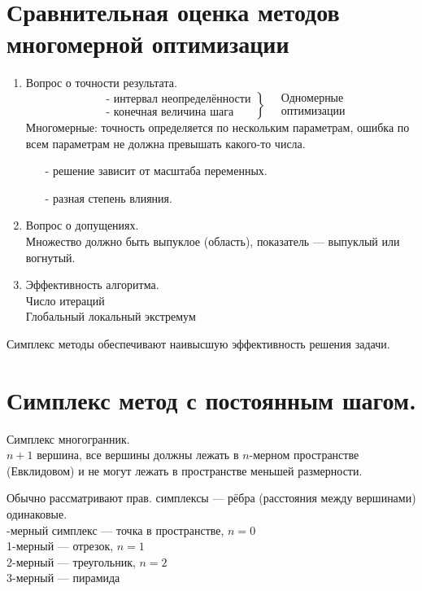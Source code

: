 \documentclass[12pt,a5paper]{scrbook}
\begin{document}
  \section{Сравнительная оценка методов многомерной оптимизации}
  \begin{enumerate}
    \item Вопрос о точности результата.
    \[
      \left.
        \begin{aligned}
          &\text{- интервал неопределённости}\\
          &\text{- конечная величина шага}
       \end{aligned}
     \right\}
     \, 
       \begin{aligned}
         &\text{Одномерные}\\ 
         &\text{оптимизации}
       \end{aligned}
    \]
    Многомерные: точность определяется по нескольким параметрам, ошибка по всем параметрам не должна превышать какого-то числа.
    \begin{itemize}
      \item[-] решение зависит от масштаба переменных.
      \item[-] разная степень влияния.
    \end{itemize}
    
    \item Вопрос о допущениях.\\
    Множество должно быть выпуклое (область), показатель --- выпуклый или вогнутый.
    
    \item Эффективность алгоритма.\\
    Число итераций\\
    Глобальный локальный экстремум
  \end{enumerate}
  Симплекс методы обеспечивают наивысшую эффективность решения задачи.
  
  \section{Симплекс метод с постоянным шагом.}
  Симплекс многогранник.\\
  $n+1$ вершина, все вершины должны лежать в $n$-мерном пространстве (Евклидовом) и не могут лежать в пространстве меньшей размерности.
  
  Обычно рассматривают прав. симплексы --- рёбра (расстояния между вершинами) одинаковые.\\-мерный симплекс --- точка в пространстве, $n=0$\\
  1-мерный --- отрезок, $n=1$\\
  2-мерный --- треугольник, $n=2$\\
  3-мерный --- пирамида\\
  
\end{document}
